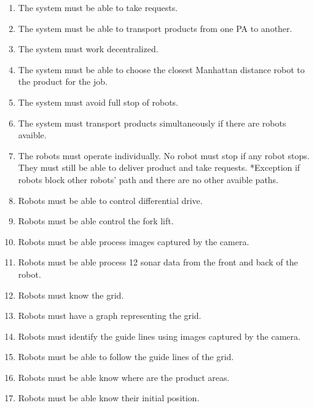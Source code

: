 \begin{enumerate}
	
	\item The system must be able to take requests. %
	\item The system must be able to transport products from one PA to another. %
	\item The system must work decentralized. %
	\item The system must be able to choose the closest Manhattan distance robot to the product for the job. %
	\item The system must avoid full stop of robots. %
	\item The system must transport products simultaneously if there are robots avaible. %
	\item The robots must operate individually. No robot must stop if any robot stops. They must still be able to deliver product and take requests. *Exception if robots block other robots' path and there are no other avaible paths. %
	\item Robots must be able to control differential drive. %
	\item Robots must be able control the fork lift. %
	\item Robots must be able process images captured by the camera. %
	\item Robots must be able process 12 sonar data from the front and back of the robot. %
	\item Robots must know the grid. %
	\item Robots must have a graph representing the grid. %
	\item Robots must identify the guide lines using images captured by the camera. %
	\item Robots must be able to follow the guide lines of the grid. %
	\item Robots must be able know where are the product areas. %
	\item Robots must be able know their initial position. %

\end{enumerate}
